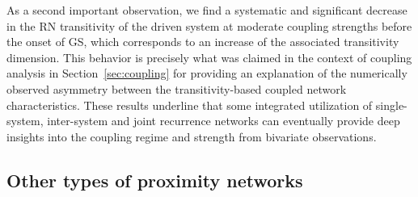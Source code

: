 		As a second important observation, we find a systematic and significant decrease in the RN transitivity of the driven system at moderate coupling strengths before the onset of GS, which corresponds to an increase of the associated transitivity dimension. This behavior is precisely what was claimed in the context of coupling analysis in Section~\ref{sec:coupling} for providing an explanation of the numerically observed asymmetry between the transitivity-based coupled network characteristics. These results underline that some integrated utilization of single-system, inter-system and joint recurrence networks can eventually provide deep insights into the coupling regime and strength from bivariate observations.

	\subsection{Other types of proximity networks} \label{sec:otherproxnets}
